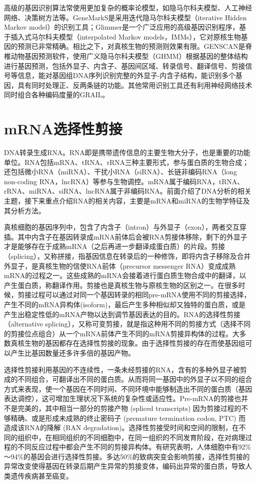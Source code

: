 高级的基因识别算法常使用更加复杂的概率论模型，如隐马尔科夫模型、人工神经网络、决策树方法等。GeneMarkS是采用迭代隐马尔科夫模型（iterative Hidden Markov model）的识别工具；Glimmer是一个广泛应用的高级基因识别程序，基于插入式马尔科夫模型（interpolated Markov models，IMMs），它对原核生物基因的预测已非常精确。相比之下，对真核生物的预测则效果有限。GENSCAN是脊椎动物基因预测软件，使用广义隐马尔科夫模型（GHMM）根据基因的整体结构进行基因预测，包括外显子、内含子、基因间区域、转录信号、翻译信号、剪接信号等信息，能对基因组DNA序列识别完整的外显子-内含子结构，能识别多个基因，具有同时处理正、反两条链的功能。其他常用识别工具还有利用神经网络技术同时组合各种编码度量的GRAIL。

\section{mRNA选择性剪接}
DNA转录生成RNA。RNA即是携带遗传信息的主要生物大分子，也是重要的功能单位。RNA包括mRNA、tRNA、rRNA三种主要形式，参与蛋白质的生物合成；还包括微小RNA（miRNA）、干扰小RNA（siRNA）、长链非编码RNA（long non-coding RNA，lncRNA）等参与生物调控。mRNA属于编码RNA，tRNA、rRNA、miRNA、siRNA、lncRNA属于非编码RNA。前面介绍了DNA分析的相关主题，接下来重点介绍RNA的相关内容，主要是mRNA和miRNA的生物学特征及其分析方法。

真核细胞的基因序列中，包含了内含子（intron）与外显子（exon），两者交互穿插。其中内含子在基因转录成mRNA前体后会被RNA剪接体移除，剩下的外显子才是能够存在于成熟mRNA（之后再进一步翻译成蛋白质）的片段。剪接（splicing），又称拼接，指基因信息在转录后的一种修饰，即将内含子移除及合并外显子，是真核生物的信使RNA前体（precursor messenger RNA）变成成熟mRNA的过程之一。这些成熟的mRNA会接着进行蛋白质生物合成中的翻译，以产生蛋白质，称翻译作用。剪接也是真核生物与原核生物的区别之一。在很多时候，剪接过程可以通过对同一个基因转录的相同pre-mRNA使用不同的剪接选择，产生不同的mRNA异构体(isoform)，最后产生多种相似却又独特的蛋白质，或是产生出稳定性低的mRNA产物以达到调节基因表达的目的。RNA的选择性剪接（alternative splicing），又称可变剪接，就是指这种用不同的剪接方式（选择不同的剪接位点组合）从一个mRNA前体产生不同的mRNA剪接异构体的过程。大多数真核生物的基因都存在选择性剪接的现象。由于选择性剪接的存在而使基因组可以产生比基因数量还多许多倍的基因产物。

选择性剪接利用基因的不连续性，一条未经剪接的RNA，含有的多种外显子被剪成的不同组合，可翻译出不同的蛋白质。从而将同一基因中的外显子以不同的组合方式来表现，使一个基因在不同时间、不同环境中能够制造出不同的蛋白质（基因表达调控），这可增加生理状况下系统的复杂性或适应性。Pre-mRNA的剪接也并不是完美的，其中相当一部分的剪接产物 (spliced transcripts) 因为剪接过程的不够精确、或是形成未成熟的终止密码子 (premature termination codon, PTC) 而造成该RNA的降解 (RAN degradation)。选择性剪接受时间和空间的限制，在不同的组织中，在相同组织的不同细胞中，在同一组织的不同发育阶段，在对病理过程的不同反应过程中都会产生不同的剪接异构体。有研究表明，人体细胞中有92\%～94\%的基因会进行选择性剪接。多达50\%的致病突变会影响剪接，选择性剪接的异常改变使得基因在转录后期产生异常的剪接变体，编码出异常的蛋白质，导致人类遗传疾病甚至癌变。

